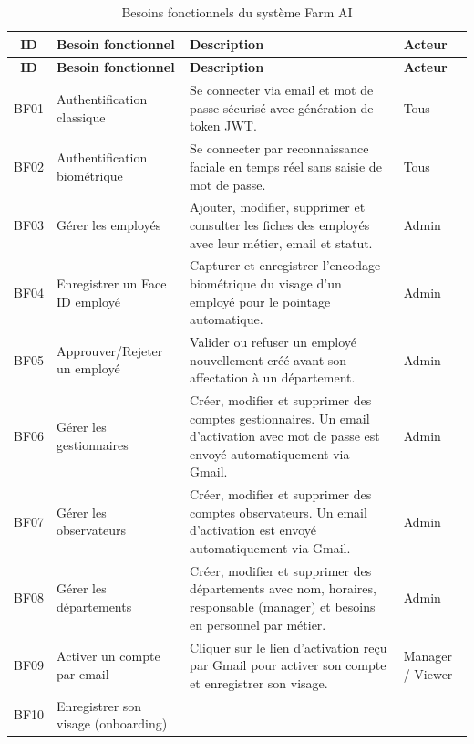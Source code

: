 \documentclass[12pt,a4paper]{report}
\numberwithin{figure}{chapter}
\numberwithin{table}{chapter}
\begin{document}
\begin{longtable}{|c|>{\raggedright\arraybackslash}p{5cm}|>{\raggedright\arraybackslash}p{6cm}|l|}
  \caption{Besoins fonctionnels du système Farm AI} \label{tab:besoins_fonctionnels} \\
  \hline
  \rowcolor{gray!20}
  \textbf{ID} & \textbf{Besoin fonctionnel} & \textbf{Description} & \textbf{Acteur} \\
  \hline
  \endfirsthead
  \hline
  \rowcolor{gray!20}
  \textbf{ID} & \textbf{Besoin fonctionnel} & \textbf{Description} & \textbf{Acteur} \\
  \hline
  \endhead
  \hline
  \endfoot

  BF01 & Authentification classique &
    Se connecter via email et mot de passe sécurisé avec génération de token JWT. &
    Tous \\
  \hline
  BF02 & Authentification biométrique &
    Se connecter par reconnaissance faciale en temps réel sans saisie de mot de passe. &
    Tous \\
  \hline
  BF03 & Gérer les employés &
    Ajouter, modifier, supprimer et consulter les fiches des employés avec leur métier, email et statut. &
    Admin \\
  \hline
  BF04 & Enregistrer un Face ID employé &
    Capturer et enregistrer l'encodage biométrique du visage d'un employé pour le pointage automatique. &
    Admin \\
  \hline
  BF05 & Approuver/Rejeter un employé &
    Valider ou refuser un employé nouvellement créé avant son affectation à un département. &
    Admin \\
  \hline
  BF06 & Gérer les gestionnaires &
    Créer, modifier et supprimer des comptes gestionnaires. Un email d'activation avec mot de passe est envoyé automatiquement via Gmail. &
    Admin \\
  \hline
  BF07 & Gérer les observateurs &
    Créer, modifier et supprimer des comptes observateurs. Un email d'activation est envoyé automatiquement via Gmail. &
    Admin \\
  \hline
  BF08 & Gérer les départements &
    Créer, modifier et supprimer des départements avec nom, horaires, responsable (manager) et besoins en personnel par métier. &
    Admin \\
  \hline
  BF09 & Activer un compte par email &
    Cliquer sur le lien d'activation reçu par Gmail pour activer son compte et enregistrer son visage. &
    Manager / Viewer \\
  \hline
  BF10 & Enregistrer son visage (onboarding) &

\end{longtable}
\end{document}
